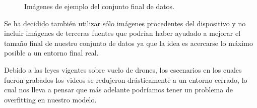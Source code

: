 \begin{figure}[H]
    \centering
	\hspace{0.05\linewidth}
	\hspace{0.05\linewidth}
	\hspace{0.05\linewidth}
    \caption[Imágenes de ejemplo del conjunto final de datos]{Imágenes de ejemplo del conjunto final de datos.}
    \label{fig-dataset-imagenes-ejemplo}
\end{figure}
\medskip
Se ha decidido también utilizar sólo imágenes procedentes del dispositivo y no incluir imágenes de terceras fuentes que podrían haber ayudado a mejorar el tamaño final de nuestro conjunto de datos ya que la idea es acercarse lo máximo posible a un entorno final real.
\medskip

Debido a las leyes vigentes sobre vuelo de drones, los escenarios en los cuales fueron grabados los videos se redujeron drásticamente a un entorno cerrado, lo cual nos lleva a pensar que más adelante podríamos tener un problema de overfitting en nuestro modelo.
\medskip


